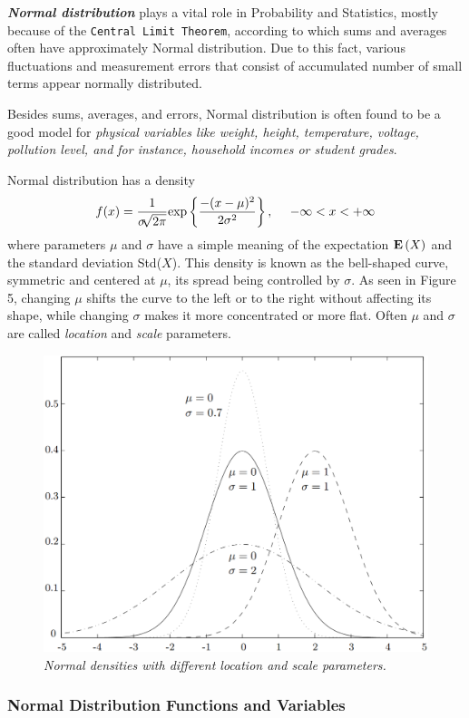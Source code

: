 \textit{\textbf{Normal distribution}} plays a vital role in Probability and Statistics, mostly because of the \texttt{Central Limit Theorem}, according to which sums and averages often have approximately Normal distribution. Due to this fact, various fluctuations and measurement errors that consist of accumulated number of small terms appear normally distributed.

Besides sums, averages, and errors, Normal distribution is often found to be a good model for \textit{physical variables like weight, height, temperature, voltage, pollution level, and for instance, household incomes or student grades}.

Normal distribution has a density
\begin{equation*}
    f(x) = \frac{1}{\sigma \sqrt[]{2 \pi}} \textnormal{exp}\left\{ \frac{-(x - \mu)^2}{2\sigma^2} \right\},\ \ \ \ -\infty < x < +\infty
\end{equation*}
where parameters $\mu$ and $\sigma$ have a simple meaning of the expectation $\mathbf{E}\left(X\right)$ and the standard deviation Std($X$). This density is known as the bell-shaped curve, symmetric and centered at $\mu$, its spread being controlled by $\sigma$. As seen in Figure 5, changing $\mu$ shifts the curve to the left or to the right without affecting its shape, while changing $\sigma$ makes it more concentrated or more flat. Often $\mu$ and $\sigma$ are called \textit{location} and \textit{scale} parameters.

\begin{figure}[h!]
    \centering
    \includegraphics[width=.5\textwidth]{img/Fig4.6.png}
    \caption{\textit{Normal densities with different location and scale parameters.}}
\end{figure}

\subsubsection{Normal Distribution Functions and Variables}

